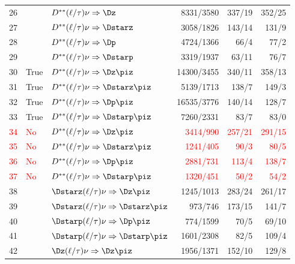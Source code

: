 \documentclass[6pt]{article}
\newcommand{\Red} [1]  {\textcolor{red}{#1}}
\begin{document}
\begin{tabular}{r l l r r r}
26  &       & $D^{**}(\ell/\tau)\nu\Rightarrow\Dz$                   &  8331/3580    & 337/19   & 352/25    \\
27  &       & $D^{**}(\ell/\tau)\nu\Rightarrow\Dstarz$               &  3058/1826    & 143/14   & 131/9     \\
28  &       & $D^{**}(\ell/\tau)\nu\Rightarrow\Dp$                   &  4724/1366    & 66/4     & 77/2      \\
29  &       & $D^{**}(\ell/\tau)\nu\Rightarrow\Dstarp$               &  3319/1937    & 63/11    & 76/7      \\\hline 
30  &  True  & $D^{**}(\ell/\tau)\nu\Rightarrow\Dz\piz$               &  14300/3455   & 340/11   & 358/13    \\
31  &  True  & $D^{**}(\ell/\tau)\nu\Rightarrow\Dstarz\piz$           &  5139/1713    & 138/7    & 149/3     \\
32  &  True  & $D^{**}(\ell/\tau)\nu\Rightarrow\Dp\piz$               &  16535/3776   & 140/14   & 128/7     \\
33  &  True  & $D^{**}(\ell/\tau)\nu\Rightarrow\Dstarp\piz$           &  7260/2331    & 83/7     & 83/0      \\
\Red{34}  &  \Red{No}   & \Red{$D^{**}(\ell/\tau)\nu\Rightarrow\Dz\piz$}               &  \Red{3414/990}     & \Red{257/21}   & \Red{291/15}    \\
\Red{35}  &  \Red{No}   & \Red{$D^{**}(\ell/\tau)\nu\Rightarrow\Dstarz\piz$}           &  \Red{1241/405}     & \Red{90/3}     & \Red{80/5}      \\
\Red{36}  &  \Red{No}   & \Red{$D^{**}(\ell/\tau)\nu\Rightarrow\Dp\piz$}               &  \Red{2881/731}     & \Red{113/4}    & \Red{138/7}     \\
\Red{37}  &  \Red{No}   & \Red{$D^{**}(\ell/\tau)\nu\Rightarrow\Dstarp\piz$}           &  \Red{1320/451}     & \Red{50/2}     & \Red{54/2}      \\
38  &       & $\Dstarz(\ell/\tau)\nu\Rightarrow\Dz\piz$              &  1245/1013    & 283/24   & 261/17    \\
39  &       & $\Dstarz(\ell/\tau)\nu\Rightarrow\Dstarz\piz$          &  973/746	     & 173/15   & 141/7     \\
40  &       & $\Dstarp(\ell/\tau)\nu\Rightarrow\Dp\piz$              &  774/1599     & 70/5     & 69/10     \\
41  &       & $\Dstarp(\ell/\tau)\nu\Rightarrow\Dstarp\piz$          &  1601/2308    & 82/5     & 109/4     \\
42  &       & $\Dz(\ell/\tau)\nu\Rightarrow\Dz\piz$                  &  1956/1371    & 152/10   & 129/8     \\

\end{tabular}
\end{document}
